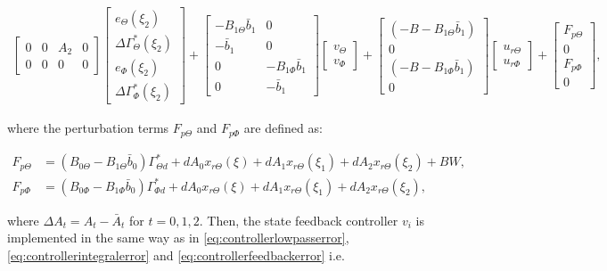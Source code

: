 \documentclass[../main.tex]{subfiles}
\begin{document}
\begin{align}
\begin{bmatrix}
0 & 0 & A_2 & 0 \\
0 & 0 & 0 & 0 
\end{bmatrix}
\begin{bmatrix}
e_\Theta(\xi_2) \\
\Delta \Gamma_\Theta^{*} (\xi_2) \\
e_\Phi(\xi_2) \\
\Delta \Gamma_\Phi^{*} (\xi_2) 
\end{bmatrix} + \begin{bmatrix}
-B_{1\Theta} \bar{b}_1 & 0 \\
-\bar{b}_1 & 0 \\
0 & -B_{1\Phi} \bar{b}_1  \\
0 & -\bar{b}_1 
\end{bmatrix}
\begin{bmatrix}
v_\Theta \\
v_\Phi
\end{bmatrix} + 
\begin{bmatrix}
(-B - B_{1\Theta}\bar{b}_1) \\
0 \\
(-B - B_{1\Phi}\bar{b}_1)  \\
0
\end{bmatrix}
\begin{bmatrix}
u_{r\Theta} \\
u_{r\Phi}
\end{bmatrix}
\label{eq:errordynamics2robust}+
\begin{bmatrix}
F_{p\Theta} \\
0 \\
F_{p\Phi} \\
0
\end{bmatrix},
\end{align}

where the perturbation terms $F_{p\Theta}$ and $F_{p\Phi}$ are defined as:

\begin{align}
	F_{p\Theta} &= (B_{0\Theta} - B_{1\Theta} \bar{b}_0)\Gamma_{\Theta d}^* + dA_0 x_{r\Theta} (\xi) + dA_1 x_{r\Theta} (\xi_1) + dA_2 x_{r\Theta} (\xi_2) + BW, \label{eq:PerturbationForces1}\\
	F_{p\Phi} &= (B_{0\Phi} - B_{1\Phi} \bar{b}_0)\Gamma_{\Phi d}^* + dA_0 x_{r\Theta} (\xi) + dA_1 x_{r\Theta} (\xi_1) + dA_2 x_{r\Theta} (\xi_2), \label{eq:PerturbationForces2}
\end{align}

where $\Delta A_t = A_t - \bar{A}_t$ for $t = 0,1,2$. Then, the state feedback controller $v_i$ is implemented in the same way as in \eqref{eq:controllerlowpasserror}, \eqref{eq:controllerintegralerror} and \eqref{eq:controllerfeedbackerror} i.e.
\end{document}
